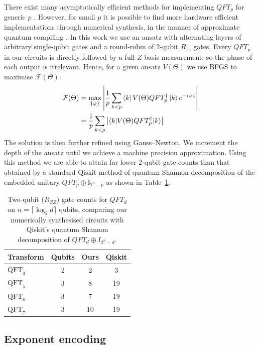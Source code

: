 \documentclass[aps,floatfix,10pt,amssymb,amsfont,amsmath,superscriptaddress,float,nofootinbib,longbibliography,nobalancelastpage,twocolumn]{revtex4-2}
\begin{document}
There exist many asymptotically efficient methods for implementing $QFT_p$ for generic $p$ \cite{kitaev1995quantum,hales2000improved, hales2002quantum, mosca2004exact, kuo2026quantum}. However, for small $p$ it is possible to find more hardware efficient implementations through numerical
synthesis, in the manner of approximate quantum compiling \cite{khatri2019quantum, madden2022best, rakyta2022approaching, nemkov2023efficient}. In this work we use an ansatz with alternating layers of arbitrary single-qubit gates and a round-robin of 2-qubit $R_{zz}$ gates. Every $QFT_p$ in our circuits is directly followed by a full $Z$ basis measurement, so the phase of each output is irrelevant. Hence, for a given ansatz $V(\Theta)$ we use BFGS to maximise $\mathcal{F}(\Theta)$:
\begin{align}
    \mathcal{F}(\Theta)
 &= \max_{\{\varphi\}}\left| \frac{1}{p}\sum_{k<p}
    \bra{k}V(\Theta) QFT_p^{\dagger}\ket{k}e^{-i\varphi_k }\right|\\
 &= \frac{1}{p}\sum_{k<p}\left|\langle k|V(\Theta) QFT_p^{\dagger}|k\rangle\right| 
\end{align}
The solution is then further refined using Gauss–Newton. We increment the depth of the ansatz until we achieve a machine precision approximation. Using this method we are able to attain far lower 2-qubit gate counts than that obtained by a standard Qiskit method of quantum Shannon decomposition of the embedded unitary $QFT_p \oplus \mathbb{I}_{2^{n}-p}$ as shown in Table~\ref{tab:fourier}.

\begin{table}[t]
\caption{Two-qubit ($R_{ZZ}$) gate counts for $QFT_d$ on $n=\lceil\log_2 d\rceil$ qubits, comparing our numerically synthesised circuits with Qiskit's quantum Shannon decomposition of $QFT_d \oplus I_{2^n-d}$.}

\label{tab:fourier}
\begin{tabular}{lccc}
\hline
Transform & Qubits & Ours & Qiskit \\
\hline
$\mathrm{QFT}_3$ & 2 & 2  & 3  \\
$\mathrm{QFT}_5$ & 3 & 8  & 19 \\
$\mathrm{QFT}_6$ & 3 & 7  & 19 \\
$\mathrm{QFT}_7$ & 3 & 10 & 19 \\
\hline
\end{tabular}
\end{table}

\subsection{Exponent encoding}
\end{document}
